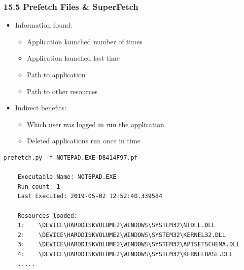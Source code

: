 \begin{frame}[fragile]
  \frametitle{15.5 Prefetch Files \& SuperFetch}
    \begin{itemize}
        \item Information found:
        \begin{itemize}
            \item Application launched number of times
            \item Application launched last time
            \item Path to application
            \item Path to other resources
        \end{itemize}
        \item Indirect benefits:
        \begin{itemize}
            \item Which user was logged in run the application
            \item Deleted applications run once in time
        \end{itemize}
    \end{itemize}
  \begin{lstlisting}[basicstyle=\tiny]
prefetch.py -f NOTEPAD.EXE-D8414F97.pf

	Executable Name: NOTEPAD.EXE
	Run count: 1
	Last Executed: 2019-05-02 12:52:40.339584

	Resources loaded:
	1:    \DEVICE\HARDDISKVOLUME2\WINDOWS\SYSTEM32\NTDLL.DLL
	2:    \DEVICE\HARDDISKVOLUME2\WINDOWS\SYSTEM32\KERNEL32.DLL
	3:    \DEVICE\HARDDISKVOLUME2\WINDOWS\SYSTEM32\APISETSCHEMA.DLL
	4:    \DEVICE\HARDDISKVOLUME2\WINDOWS\SYSTEM32\KERNELBASE.DLL
	.....
  \end{lstlisting}
\end{frame}




